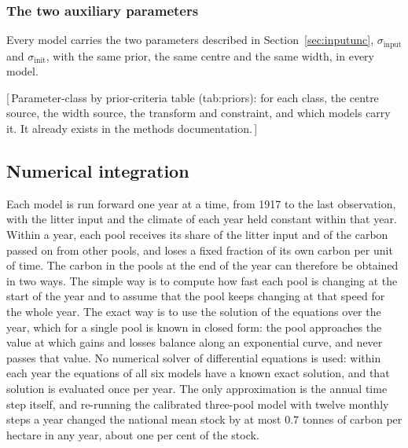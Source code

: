 \documentclass[11pt]{article}
\newcommand{\gap}[1]{\textcolor{red!70!black}{\small[\,#1\,]}}
\begin{document}
\subsubsection{The two auxiliary parameters}

Every model carries the two parameters described in Section~\ref{sec:inputunc},
$\sigma_{\mathrm{input}}$ and $\sigma_{\mathrm{init}}$, with the same prior, the same
centre and the same width, in every model.

\gap{Parameter-class by prior-criteria table (tab:priors): for each class, the centre
source, the width source, the transform and constraint, and which models carry it. It
already exists in the methods documentation.}

\subsection{Numerical integration}

Each model is run forward one year at a time, from 1917 to the last observation, with
the litter input and the climate of each year held constant within that year. Within a
year, each pool receives its share of the litter input and of the carbon passed on from
other pools, and loses a fixed fraction of its own carbon per unit of time. The carbon
in the pools at the end of the year can therefore be obtained in two ways. The simple
way is to compute how fast each pool is changing at the start of the year and to
assume that the pool keeps changing at that speed for the whole year. The exact way is
to use the solution of the equations over the year, which for a single pool is known
in closed form: the pool approaches the value at which gains and losses balance along
an exponential curve, and never passes that value. No numerical solver of differential
equations is used: within each year the equations of all six models have a known exact
solution, and that solution is evaluated once per year. The only approximation is the
annual time step itself, and re-running the calibrated three-pool model with twelve
monthly steps a year changed the national mean stock by at most $0.7$ tonnes of carbon
per hectare in any year, about one per cent of the stock.
\end{document}
